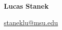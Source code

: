 

%


% 

\noindent  \LARGE{\textbf{Lucas Stanek}} %

\normalsize
\noindent \href{mailto:staneklu@msu.edu}{staneklu@msu.edu}

\noindent\hrulefill
\vspace{1em}

